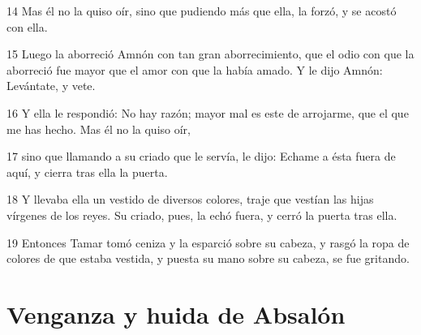 \par 14 Mas él no la quiso oír, sino que pudiendo más que ella, la forzó, y se acostó con ella.
\par 15 Luego la aborreció Amnón con tan gran aborrecimiento, que el odio con que la aborreció fue mayor que el amor con que la había amado. Y le dijo Amnón: Levántate, y vete.
\par 16 Y ella le respondió: No hay razón; mayor mal es este de arrojarme, que el que me has hecho. Mas él no la quiso oír,
\par 17 sino que llamando a su criado que le servía, le dijo: Echame a ésta fuera de aquí, y cierra tras ella la puerta.
\par 18 Y llevaba ella un vestido de diversos colores, traje que vestían las hijas vírgenes de los reyes. Su criado, pues, la echó fuera, y cerró la puerta tras ella.
\par 19 Entonces Tamar tomó ceniza y la esparció sobre su cabeza, y rasgó la ropa de colores de que estaba vestida, y puesta su mano sobre su cabeza, se fue gritando.

\section*{Venganza y huida de Absalón}

